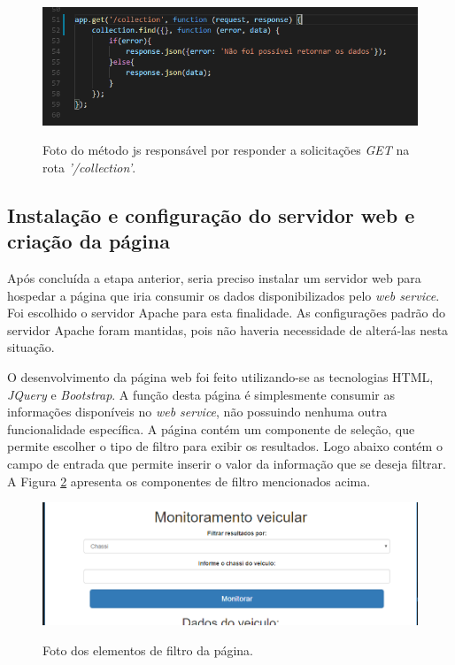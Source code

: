 \begin{figure}[!ht]
\centering
\caption{Foto do método js responsável por responder a solicitações \textit{GET} na rota \textit{'/collection'}.} 
{\includegraphics[scale=.66]{imagens/GET-collection_webservice.png}}\\
 \label{Fig:get_collection}
\end{figure}

\subsection{\textbf{Instalação e configuração do servidor web e criação da página}}
Após concluída a etapa anterior, seria preciso instalar um servidor web para hospedar a página que iria consumir os dados disponibilizados pelo \textit{web service}. Foi escolhido o servidor Apache para esta finalidade. As configurações padrão do servidor Apache foram mantidas, pois não haveria necessidade de alterá-las nesta situação.

O desenvolvimento da página web foi feito utilizando-se as tecnologias HTML, \textit{JQuery} e \textit{Bootstrap}. A função desta página é simplesmente consumir as informações disponíveis no \textit{web service}, não possuindo nenhuma outra funcionalidade específica. A página contém um componente de seleção, que permite escolher o tipo de filtro para exibir os resultados. Logo abaixo contém o campo de entrada que permite inserir o valor da informação que se deseja filtrar. A Figura \ref{Fig:input_fitros} apresenta os componentes de filtro mencionados acima.

\begin{figure}[!ht]
\centering
\caption{Foto dos elementos de filtro da página.} 
{\includegraphics[scale=.62]{imagens/paginaweb_inputs.png}}\\
 \label{Fig:input_fitros}
\end{figure}

